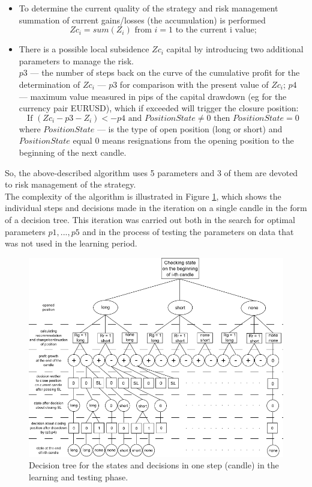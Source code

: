 \documentclass[runningheads,a4paper]{llncs}
\begin{document}
\begin{itemize}
\item To determine the current quality of the strategy and risk management summation of current gains/losses (the accumulation) is performed
\begin{equation}
Zc_i = sum ( Z_i ) \text{ from } i = 1 \text{ to the current i value;}
\end{equation}
\item There is a possible local subsidence $Zc_i$ capital by introducing two additional parameters to manage the risk.\\
$p3$ --- the number of steps back on the curve of the cumulative profit for the determination of $Zc_i$ --- $p3$ for comparison with the present value of $Zc_i$;
$p4$ --- maximum value measured in pips of the capital drawdown (eg for the currency pair EURUSD), which if exceeded will trigger the closure position:\\
\begin{equation}
\text{If } ( Zc_i - p3 - Z_i ) <- p4 \text{ and } PositionState \neq 0 \text{ then } PositionState = 0
\end{equation} 
where $PositionState$ --- is the type of open position (long or short) and $PositionState$ equal 0 means resignations from the opening position to the beginning of the next candle.
\end{itemize}
So, the above-described algorithm uses 5 parameters and 3 of them are devoted to risk management of the strategy.\\
The complexity of the algorithm is illustrated in Figure \ref{fig:fig7}, which shows the individual steps and decisions made in the iteration on a single candle in the form of a decision tree. This iteration was carried out both in the search for optimal parameters $p1, ..., p5$ and in the process of testing the parameters on data that was not used in the learning period.
\begin{figure}[h!]
\centering
\includegraphics[width = \textwidth]{figures/rys7.png}
\caption{Decision tree for the states and decisions in one step (candle) in the learning and testing phase.}
\label{fig:fig7}
\end{figure}
\FloatBarrier
\end{document}
